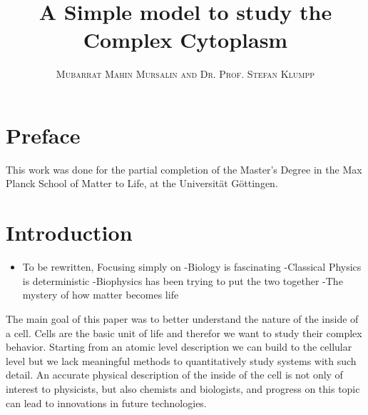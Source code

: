 \documentclass[a4paper,11pt,oneside]{book}
\title{\Huge \textbf{A Simple model to study the Complex Cytoplasm}}
\author{\textsc{Mubarrat Mahin Mursalin and Dr. Prof. Stefan Klumpp}}
\begin{document}
\sloppy

\frontmatter
\maketitle

\tableofcontents

\mainmatter

% 
% 

\section{Preface}

This work was done for the partial completion of the Master's Degree in the Max Planck School of Matter to Life, at the Universität Göttingen.

\section{Introduction}

\begin{itemize}
\item To be rewritten, Focusing simply on\newline
-Biology is fascinating\newline
-Classical Physics is deterministic\newline
-Biophysics has been trying to put the two together\newline
-The mystery of how matter becomes life
\end{itemize}

The main goal of this paper was to better understand the nature of the inside of a cell. Cells are the basic unit of life and therefor we want to study their complex behavior. Starting from an atomic level description we can build to the cellular level but we lack meaningful methods to quantitatively study systems with such detail. An accurate physical description of the inside of the cell is not only of interest to physicists, but also chemists and biologists, and progress on this topic can lead to innovations in future technologies.
\end{document}
